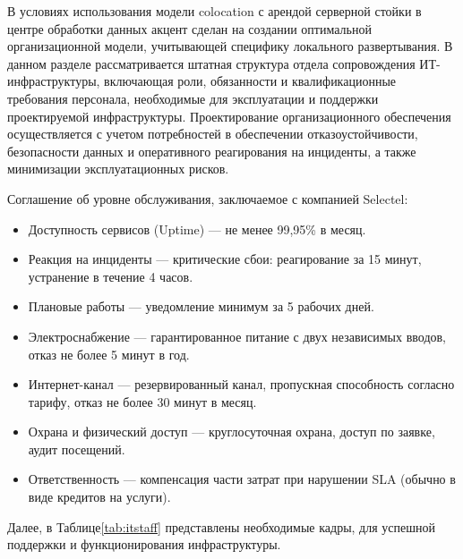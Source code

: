 \documentclass[14pt, a4paper]{extarticle}
\begin{document}
В условиях использования модели colocation с арендой серверной стойки в центре
обработки данных акцент сделан на создании оптимальной организационной модели,
учитывающей специфику локального развертывания. В данном разделе рассматривается
штатная структура отдела сопровождения ИТ-инфраструктуры, включающая роли,
обязанности и квалификационные требования персонала, необходимые для эксплуатации
и поддержки проектируемой инфраструктуры. Проектирование организационного обеспечения
осуществляется с учетом потребностей в обеспечении отказоустойчивости, безопасности
данных и оперативного реагирования на инциденты, а также минимизации эксплуатационных рисков.

Соглашение об уровне обслуживания, заключаемое с компанией Selectel:
\begin{itemize}
  \item Доступность сервисов (Uptime) — не менее 99,95\% в месяц.
  \item Реакция на инциденты — критические сбои: реагирование за 15 минут, устранение в течение 4 часов.
  \item Плановые работы — уведомление минимум за 5 рабочих дней.
  \item Электроснабжение — гарантированное питание с двух независимых вводов, отказ не более 5 минут в год.
  \item Интернет-канал — резервированный канал, пропускная способность согласно тарифу, отказ не более 30 минут в месяц.
  \item Охрана и физический доступ — круглосуточная охрана, доступ по заявке, аудит посещений.
  \item Ответственность — компенсация части затрат при нарушении SLA (обычно в виде кредитов на услуги).
\end{itemize}

Далее, в Таблице\;\ref{tab:itstaff} представлены необходимые кадры, для успешной поддержки и
функционирования инфраструктуры.
\end{document}
